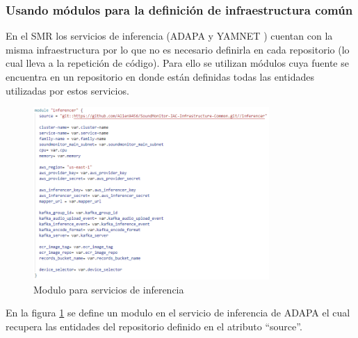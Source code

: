 \subsubsection{Usando módulos para la definición de infraestructura común}

En el SMR los servicios de inferencia (ADAPA \cite{EstebanInferencerAdapa2020} y YAMNET \cite{EstebanYAMNET2021}) cuentan con la misma infraestructura por lo que no es necesario definirla en cada repositorio (lo cual lleva a la repetición de código). Para ello se utilizan módulos cuya fuente se encuentra en un repositorio \cite{EstebanInferencerCommon2021} en donde están definidas todas las entidades utilizadas por estos servicios.

\begin{figure}[H]
	\centering
	\includegraphics[width=0.8\textwidth]{bibliografia/Imagenes/moduleInferencer.png}
	\caption{Modulo para servicios de inferencia}
	\label{moduleTerraform}
\end{figure}

En la figura \ref{moduleTerraform} se define un modulo en el servicio de inferencia de ADAPA el cual recupera las entidades del repositorio definido en el atributo ``source''.


